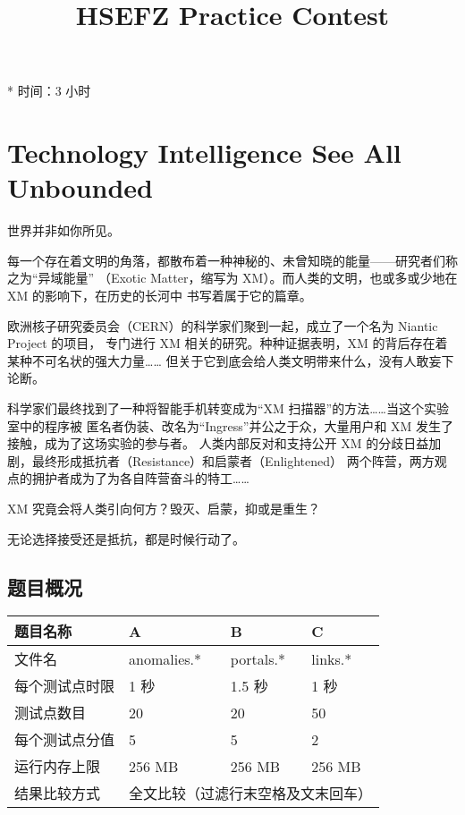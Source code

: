 \documentclass[UTF8, 11pt, a4paper]{article}
\begin{document}
\title{HSEFZ Practice Contest}
\maketitle

* 时间：3 小时
\newpage

\section*{Technology Intelligence See All Unbounded}

世界并非如你所见。

每一个存在着文明的角落，都散布着一种神秘的、未曾知晓的能量——研究者们称之为“异域能量”%
（Exotic Matter，缩写为 XM）。而人类的文明，也或多或少地在 XM 的影响下，在历史的长河中%
书写着属于它的篇章。

欧洲核子研究委员会（CERN）的科学家们聚到一起，成立了一个名为 Niantic Project 的项目，%
专门进行 XM 相关的研究。种种证据表明，XM 的背后存在着某种不可名状的强大力量……%
但关于它到底会给人类文明带来什么，没有人敢妄下论断。

科学家们最终找到了一种将智能手机转变成为“XM 扫描器”的方法……当这个实验室中的程序被%
匿名者伪装、改名为“Ingress”并公之于众，大量用户和 XM 发生了接触，成为了这场实验的参与者。%
人类内部反对和支持公开 XM 的分歧日益加剧，最终形成抵抗者（Resistance）和启蒙者（Enlightened）%
两个阵营，两方观点的拥护者成为了为各自阵营奋斗的特工……

XM 究竟会将人类引向何方？毁灭、启蒙，抑或是重生？

无论选择接受还是抵抗，都是时候行动了。
\newline\newline

\subsection*{题目概况}
\begin{tabularx}{\textwidth}{|X|X|X|X|}
\hline
题目名称 & A & B & C \\ \hline
文件名 & anomalies.* & portals.* & links.* \\ \hline
每个测试点时限 & 1 秒 & 1.5 秒 & 1 秒 \\ \hline
测试点数目 & 20 & 20 & 50 \\ \hline
每个测试点分值 & 5 & 5 & 2 \\ \hline
运行内存上限 & 256 MB & 256 MB & 256 MB \\ \hline
结果比较方式 & \multicolumn{3}{c|}{全文比较（过滤行末空格及文末回车）} \\ \hline
\end{tabularx}
\end{document}
